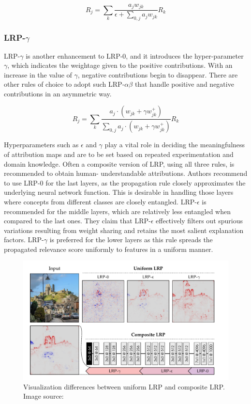 \documentclass[../report.tex]{subfiles}
\begin{document}
\begin{equation}
	R_j=\sum_k \frac{a_j w_{j k}}{\epsilon+\sum_{0, j} a_j w_{j k}} R_k
\end{equation}

\subsubsection{LRP-$\gamma$}
LRP-$\gamma$ is another enhancement to LRP-0, and it introduces the hyper-parameter $\gamma$, which indicates the weightage given to the positive contributions. With an increase in the value of $\gamma$, negative contributions begin to disappear. There are other rules of choice to adopt such LRP-$\alpha\beta$ that handle positive and negative contributions in an asymmetric way.

\begin{equation}
	R_j=\sum_k \frac{a_j \cdot\left(w_{j k}+\gamma w_{j k}^{+}\right)}{\sum_{0, j} a_j \cdot\left(w_{j k}+\gamma w_{j k}^{+}\right)} R_k
\end{equation}


Hyperparameters such as $\epsilon$ and $\gamma$ play a vital role in deciding the meaningfulness of attribution maps and are to be set based on repeated experimentation and domain knowledge. Often a composite version of LRP, using all three rules, is recommended to obtain human- understandable attributions.
Authors recommend to use LRP-0 for the last layers, as the propagation rule closely approximates the underlying  neural network function. This is desirable in handling those layers where concepts from different classes are closely entangled. LRP-$\epsilon$ is recommended for the middle layers, which are relatively less entangled when compared to the last ones. They claim that LRP-$\epsilon$ effectively filters out spurious variations resulting from weight sharing and retains the most salient explanation factors. LRP-$\gamma$ is preferred for the lower layers as this rule spreads the propagated relevance score uniformly to features in a uniform manner.

 \begin{figure}[H]
	\centering
	\includegraphics[scale=0.3]{images/chapter3/lrp.png}
	\caption[Visualization differences between uniform LRP and composite LRP]{Visualization differences between uniform LRP and composite LRP. Image source: \cite{lrp}}
	\label{fig_lrp}
\end{figure}
\end{document}
